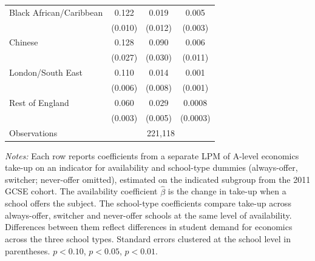 \begin{table}[htbp]
\begin{tabular}{l ccc}
Black African/Caribbean       & 0.122\sym{***}& 0.019& 0.005\\
                              & (0.010)       & (0.012)       & (0.003)       \\
Chinese                       & 0.128\sym{***}& 0.090\sym{***}& 0.006\\
                              & (0.027)       & (0.030)       & (0.011)       \\
\addlinespace
London/South East             & 0.110\sym{***}& 0.014\sym{*}& 0.001\\
                              & (0.006)       & (0.008)       & (0.001)       \\
Rest of England               & 0.060\sym{***}& 0.029\sym{***}& 0.0008\sym{***}\\
                              & (0.003)       & (0.005)       & (0.0003)       \\
\addlinespace
Observations                  & \multicolumn{3}{c}{221,118} \\
\bottomrule
\end{tabular}
\begin{minipage}{\textwidth}
\smallskip
\footnotesize
\textit{Notes:} Each row reports coefficients from a separate LPM of A-level economics take-up on an indicator for availability and school-type dummies (always-offer, switcher; never-offer omitted), estimated on the indicated subgroup from the 2011 GCSE cohort. The availability coefficient $\hat{\beta}$ is the change in take-up when a school offers the subject. The school-type coefficients compare take-up across always-offer, switcher and never-offer schools at the same level of availability. Differences between them reflect differences in student demand for economics across the three school types. Standard errors clustered at the school level in parentheses. \sym{*} $p<0.10$, \sym{**} $p<0.05$, \sym{***} $p<0.01$.
\end{minipage}
\end{table}
